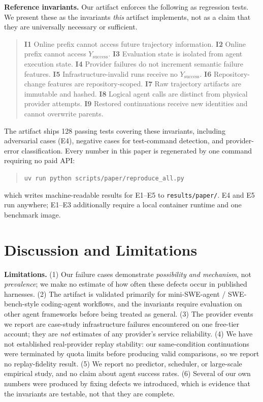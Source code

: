 \documentclass[letterpaper]{article}
\begin{document}
\noindent\textbf{Reference invariants.} Our artifact enforces the following as
regression tests. We present these as the invariants \emph{this} artifact
implements, not as a claim that they are universally necessary or sufficient.

\begin{quote}\small
\textbf{I1} Online prefix cannot access future trajectory information.
\textbf{I2} Online prefix cannot access $Y_{\text{success}}$.
\textbf{I3} Evaluation state is isolated from agent execution state.
\textbf{I4} Provider failures do not increment semantic failure features.
\textbf{I5} Infrastructure-invalid runs receive no $Y_{\text{success}}$.
\textbf{I6} Repository-change features are repository-scoped.
\textbf{I7} Raw trajectory artifacts are immutable and hashed.
\textbf{I8} Logical agent calls are distinct from physical provider attempts.
\textbf{I9} Restored continuations receive new identities and cannot overwrite
parents.
\end{quote}

The artifact ships 128 passing tests covering these invariants, including
adversarial cases (E4), negative cases for test-command detection, and
provider-error classification. Every number in this paper is regenerated by one
command requiring no paid API:

\begin{quote}\footnotesize
\texttt{uv run python scripts/paper/reproduce\_all.py}
\end{quote}

\noindent which writes machine-readable results for E1--E5 to
\texttt{results/paper/}. E4 and E5 run anywhere; E1--E3 additionally require a
local container runtime and one benchmark image.

\section{Discussion and Limitations}

\noindent\textbf{Limitations.} (1) Our failure cases demonstrate
\emph{possibility and mechanism}, not \emph{prevalence}; we make no estimate of
how often these defects occur in published harnesses. (2) The artifact is
validated primarily for mini-SWE-agent / SWE-bench-style coding-agent workflows,
and the invariants require evaluation on other agent frameworks before being
treated as general. (3) The provider events we report are case-study
infrastructure failures encountered on one free-tier account; they are
\emph{not} estimates of any provider's service reliability. (4) We have not
established real-provider replay stability: our same-condition continuations
were terminated by quota limits before producing valid comparisons, so we report
no replay-fidelity result. (5) We report no predictor, scheduler, or
large-scale empirical study, and no claim about agent success rates. (6) Several
of our own numbers were produced by fixing defects we introduced, which is
evidence that the invariants are testable, not that they are complete.
\end{document}
